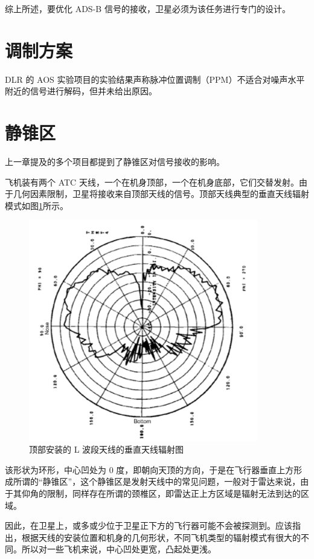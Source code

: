 综上所述，要优化 ADS-B 信号的接收，卫星必须为该任务进行专门的设计。


\section{调制方案}

DLR 的 AOS 实验项目的实验结果声称脉冲位置调制（PPM）不适合对噪声水平附近的信号进行解码，但并未给出原因。


\section{静锥区}

上一章提及的多个项目都提到了静锥区对信号接收的影响。

飞机装有两个 ATC 天线，一个在机身顶部，一个在机身底部，它们交替发射。由于几何因素限制，卫星将接收来自顶部天线的信号。顶部天线典型的垂直天线辐射模式如图\ref{fig:antenna_of_plane-1}所示。

\begin{figure}[!htb]
\centering
\includegraphics[width=10cm]{pic/antenna_of_plane.png}
\caption{顶部安装的 L 波段天线的垂直天线辐射图\protect\footnotemark}
\label{fig:antenna_of_plane-1}
\end{figure}


该形状为环形，中心凹处为 0 度，即朝向天顶的方向，于是在飞行器垂直上方形成所谓的“静锥区”，这个静锥区是发射天线中的常见问题，一般对于雷达来说，由于其仰角的限制，同样存在所谓的颈椎区，即雷达正上方区域是辐射无法到达的区域。

因此，在卫星上，或多或少位于卫星正下方的飞行器可能不会被探测到。应该指出，根据天线的安装位置和机身的几何形状，不同飞机类型的辐射模式有很大的不同。所以对一些飞机来说，中心凹处更宽，凸起处更浅。

